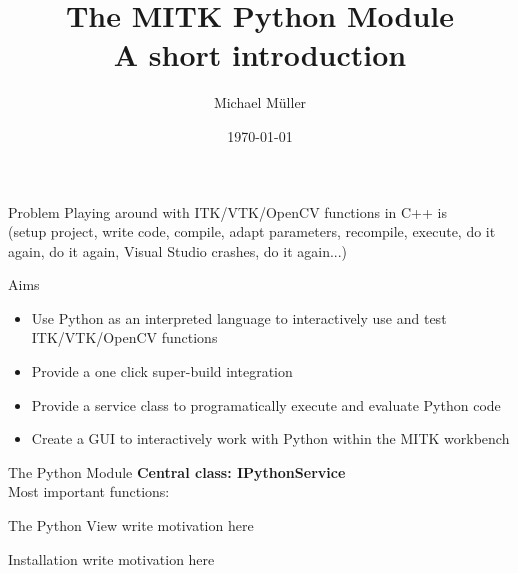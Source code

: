 \documentclass{beamer}
\title[The MITK Python Module]{The MITK Python Module\\A short introduction}
\author{Michael Müller}
\institute{mitk.org}
\date{\today}
\begin{document}
\begin{frame}
\titlepage
\end{frame}

\begin{frame}{Problem}
Playing around with ITK/VTK/OpenCV functions in C++ is
\\(setup project, write code, compile, adapt parameters, recompile, execute, do it again, do it again, Visual Studio crashes, do it again...)
\end{frame}

\begin{frame}{Aims}
\begin{itemize}
\item Use Python as an interpreted language to interactively use and test ITK/VTK/OpenCV functions \pause
\item Provide a one click super-build integration \pause
\item Provide a service class to programatically execute and evaluate Python code \pause
\item Create a GUI to interactively work with Python within the MITK workbench
\end{itemize}
\end{frame}

\begin{frame}{The Python Module}
\textbf{Central class: IPythonService}\\
Most important functions:\\

\end{frame}

\begin{frame}{The Python View}
write motivation here
\end{frame}

\begin{frame}{Installation}
write motivation here
\end{frame}
\end{document}
